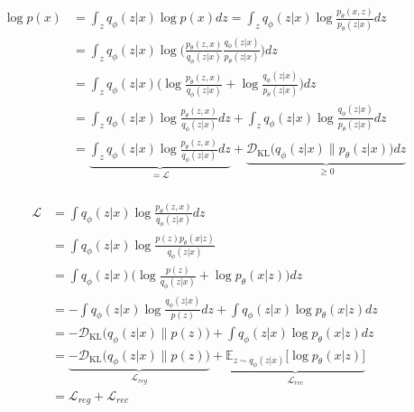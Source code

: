 \documentclass[11pt, a4paper, landscape]{article}
\begin{document}
\NewPage{}
\begin{align*}
	\log p(x) &= \int_z q_\phi(z|x) \log p(x) dz
	= \int_z q_\phi(z|x) \log \frac{p_\theta(x,z)}{p_\theta(z|x)} dz\\
	&= \int_z q_\phi(z|x) \log\bigg(\frac{p_\theta(z,x)}{q_\phi(z|x)} \frac{q_\phi(z|x)}{p_\theta(z|x)}\bigg) dz\\
	&= \int_z q_\phi(z|x) \bigg(\log\frac{p_\theta(z,x)}{q_\phi(z|x)} + \log\frac{q_\phi(z|x)}{p_\theta(z|x)}\bigg) dz\\
	&= \int_z q_\phi(z|x) \log \frac{p_\theta(z,x)}{q_\phi(z|x)} dz + \int_z q_\phi(z|x) \log\frac{q_\phi(z|x)}{p_\theta(z|x)} dz\\
	&= \underbrace{\int_z q_\phi(z|x) \log \frac{p_\theta(z,x)}{q_\phi(z|x)} dz}_{= \mathcal{L}}+ \underbrace{\mathcal{D}_{\mathrm{KL}}\big(q_\phi(z|x) \| p_\theta(z|x)\big) dz}_{\geq 0}\\
\end{align*}

\NewPage{}
\begin{align*}
	\mathcal{L}
	&= \int q_\phi(z|x) \log\frac{p_\theta(z,x)}{q_\phi(z|x)} dz\\
	&= \int q_\phi(z|x) \log\frac{p(z) p_\theta(x|z)}{q_\phi(z|x)}\\
	&= \int q_\phi(z|x) \bigg(\log\frac{p(z)}{q_\phi(z|x)} + \log p_\theta(x|z)\bigg) dz\\
	&= -\int q_\phi(z|x) \log\frac{q_\phi(z|x)}{p(z)} dz + \int q_\phi(z|x) \log p_\theta(x|z) dz\\
	&= -\mathcal{D}_{\mathrm{KL}}\big(q_\phi(z|x) \| p(z)\big) + \int q_\phi(z|x) \log p_\theta(x|z) dz\\
	&= \underbrace{-\mathcal{D}_{\mathrm{KL}}\big(q_\phi(z|x) \| p(z)\big)}_{\mathcal{L}_{reg}} + \underbrace{\mathbb{E}_{z \sim q_\phi(z|x)}\big[ \log p_\theta(x|z)\big]}_{\mathcal{L}_{rec}}\\
	&= \mathcal{L}_{reg} + \mathcal{L}_{rec}
\end{align*}
\end{document}
